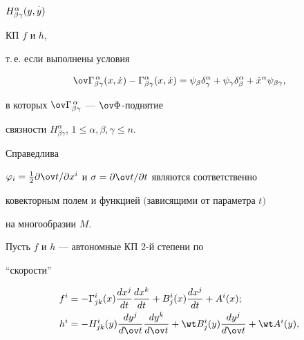 $H^\alpha_{\beta\gamma}(y,\overset{\cdot}{y}{})$ 


КП $f$ и $h$, 


т.\,е. если выполнены условия 


\begin{equation} 


\ov\Gamma^{\,\alpha}_{\beta\gamma}(x,\Dot x)- 


\Gamma^\alpha_{\beta\gamma}(x,\Dot x)= 


\psi_\beta\delta^\alpha_\gamma+ 


\psi_\gamma\delta^\alpha_\beta+ 


\Dot x^\alpha\psi_{\beta\gamma}, 


\end{equation} 


в которых $\ov\Gamma^{\,\alpha}_{\beta\gamma}$ --- $\ov\Phi$-поднятие 


связности $H^\alpha_{\beta\gamma}$, $1\le\alpha,\beta,\gamma\le n$. 


 


Справедлива 


 


\begin{lem} 


$\varphi_i=\frac{1}{2}\partial\ov t/\partial x^i$ и $\sigma=\partial\ov 


t/\partial t$ являются соответственно


ковекторным полем и функцией $($зависящими от параметра $t)$ 


на многообразии $M$. 


\end{lem} 


 


Пусть $f$ и $h$ --- автономные КП 2-й степени по 


``скорости'' 


\begin{equation} 


\begin{split} 


f^i&=-\Gamma^i_{j k}(x)\frac{dx^j}{dt}\frac{dx^k}{dt}+B^i_j(x) 


\frac{dx^j}{dt}+A^i(x);\\ 


h^i&=-H^i_{j k}(y)\frac{dy^j}{d\ov t}\frac{dy^k}{d\ov t}+ 


\wt B^i_j(y)\frac{dy^j}{d\ov t}+\wt A^i(y), 


\end{split} 


\end{equation} 


